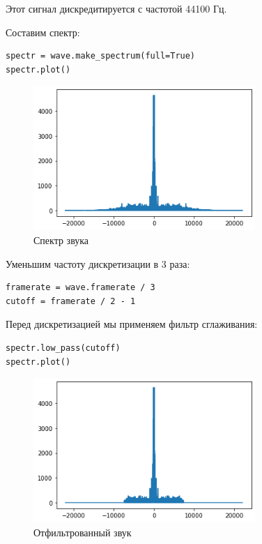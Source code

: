 \documentclass[a4paper,12pt]{report}
\begin{document}
Этот сигнал дискредитируется с частотой 44100 Гц.

Составим спектр:

\begin{lstlisting}[caption=Спектр звука]
spectr = wave.make_spectrum(full=True)
spectr.plot()
\end{lstlisting}

\begin{figure}[H]
        \centering
        \includegraphics[width=0.75\textwidth]{2.png}
        \caption{Спектр звука}
        \label{2}
\end{figure}

Уменьшим частоту дискретизации в 3 раза:

\begin{lstlisting}[caption=Уменьшение частоты дискретизации]
framerate = wave.framerate / 3
cutoff = framerate / 2 - 1
\end{lstlisting}

Перед дискретизацией мы применяем фильтр сглаживания:

\begin{lstlisting}[caption=Отфильтрованный звук]
spectr.low_pass(cutoff)
spectr.plot()
\end{lstlisting}

\begin{figure}[H]
        \centering
        \includegraphics[width=0.75\textwidth]{3.png}
        \caption{Отфильтрованный звук}
        \label{3}
\end{figure}
\end{document}
